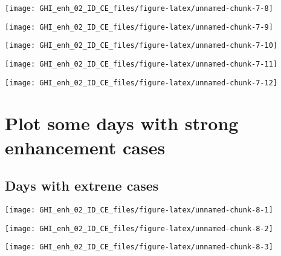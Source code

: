 \documentclass[
  10pt,
  a4paper,oneside]{article}
\begin{document}
\begin{center}\texttt{[image: GHI\_enh\_02\_ID\_CE\_files/figure-latex/unnamed-chunk-7-8]} \end{center}

\begin{center}\texttt{[image: GHI\_enh\_02\_ID\_CE\_files/figure-latex/unnamed-chunk-7-9]} \end{center}

\begin{center}\texttt{[image: GHI\_enh\_02\_ID\_CE\_files/figure-latex/unnamed-chunk-7-10]} \end{center}

\begin{center}\texttt{[image: GHI\_enh\_02\_ID\_CE\_files/figure-latex/unnamed-chunk-7-11]} \end{center}

\begin{center}\texttt{[image: GHI\_enh\_02\_ID\_CE\_files/figure-latex/unnamed-chunk-7-12]} \end{center}

\FloatBarrier

\hypertarget{plot-some-days-with-strong-enhancement-cases}{%
\section{Plot some days with strong enhancement cases}\label{plot-some-days-with-strong-enhancement-cases}}

\FloatBarrier

\hypertarget{days-with-extrene-cases}{%
\subsection{Days with extrene cases}\label{days-with-extrene-cases}}

\begin{center}\texttt{[image: GHI\_enh\_02\_ID\_CE\_files/figure-latex/unnamed-chunk-8-1]} \end{center}

\begin{center}\texttt{[image: GHI\_enh\_02\_ID\_CE\_files/figure-latex/unnamed-chunk-8-2]} \end{center}

\begin{center}\texttt{[image: GHI\_enh\_02\_ID\_CE\_files/figure-latex/unnamed-chunk-8-3]} \end{center}
\end{document}
